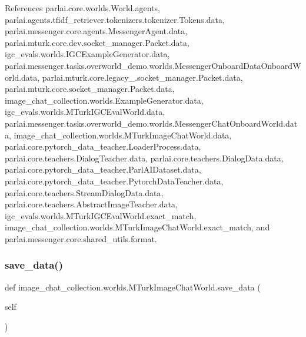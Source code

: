 References parlai.\+core.\+worlds.\+World.\+agents, parlai.\+agents.\+tfidf\+\_\+retriever.\+tokenizers.\+tokenizer.\+Tokens.\+data, parlai.\+messenger.\+core.\+agents.\+Messenger\+Agent.\+data, parlai.\+mturk.\+core.\+dev.\+socket\+\_\+manager.\+Packet.\+data, igc\+\_\+evals.\+worlds.\+I\+G\+C\+Example\+Generator.\+data, parlai.\+messenger.\+tasks.\+overworld\+\_\+demo.\+worlds.\+Messenger\+Onboard\+Data\+Onboard\+World.\+data, parlai.\+mturk.\+core.\+legacy\+\_.\+socket\+\_\+manager.\+Packet.\+data, parlai.\+mturk.\+core.\+socket\+\_\+manager.\+Packet.\+data, image\+\_\+chat\+\_\+collection.\+worlds.\+Example\+Generator.\+data, igc\+\_\+evals.\+worlds.\+M\+Turk\+I\+G\+C\+Eval\+World.\+data, parlai.\+messenger.\+tasks.\+overworld\+\_\+demo.\+worlds.\+Messenger\+Chat\+Onboard\+World.\+data, image\+\_\+chat\+\_\+collection.\+worlds.\+M\+Turk\+Image\+Chat\+World.\+data, parlai.\+core.\+pytorch\+\_\+data\+\_\+teacher.\+Loader\+Process.\+data, parlai.\+core.\+teachers.\+Dialog\+Teacher.\+data, parlai.\+core.\+teachers.\+Dialog\+Data.\+data, parlai.\+core.\+pytorch\+\_\+data\+\_\+teacher.\+Parl\+A\+I\+Dataset.\+data, parlai.\+core.\+pytorch\+\_\+data\+\_\+teacher.\+Pytorch\+Data\+Teacher.\+data, parlai.\+core.\+teachers.\+Stream\+Dialog\+Data.\+data, parlai.\+core.\+teachers.\+Abstract\+Image\+Teacher.\+data, igc\+\_\+evals.\+worlds.\+M\+Turk\+I\+G\+C\+Eval\+World.\+exact\+\_\+match, image\+\_\+chat\+\_\+collection.\+worlds.\+M\+Turk\+Image\+Chat\+World.\+exact\+\_\+match, and parlai.\+messenger.\+core.\+shared\+\_\+utils.\+format.

\mbox{\label{classimage__chat__collection_1_1worlds_1_1MTurkImageChatWorld_ac4710715dfda617f14c962e641fd16b9}} 
\subsubsection{\texorpdfstring{save\+\_\+data()}{save\_data()}}
{\footnotesize\ttfamily def image\+\_\+chat\+\_\+collection.\+worlds.\+M\+Turk\+Image\+Chat\+World.\+save\+\_\+data (\begin{DoxyParamCaption}\item[{}]{self }\end{DoxyParamCaption})}



